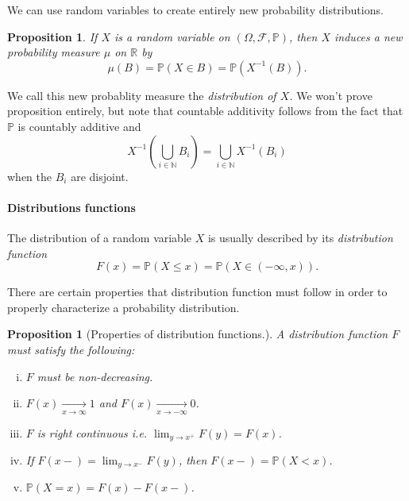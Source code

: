 \documentclass[12pt]{article}
\newcommand{\bbN}{\mathbb{N}}
\newcommand{\bbR}{\mathbb{R}}
\newcommand{\calF}{\mathcal{F}}
\newcommand{\Prob}{\mathbb{P}}
\newtheorem{prop}[thm]{Proposition}
\theoremstyle{definition}
\theoremstyle{remark}
\numberwithin{equation}{section}
\begin{document}
We can use random variables to create entirely new probability distributions. 

\begin{prop}
  If $X$ is a random variable on $(\Omega, \calF, \Prob)$, then $X$ induces a new probability measure $\mu$ on $\bbR$ by
  \begin{equation}
    \mu(B) = \Prob(X \in B) = \Prob( X^{-1}(B) ).
  \end{equation}
\end{prop}
We call this new probablity measure the \emph{distribution of $X$.} We won't prove proposition entirely, but note that countable additivity follows from the fact that $\Prob$ is countably additive and 
\begin{equation}
   X^{-1}\left(\bigcup_{i\in\bbN} B_i\right) = \bigcup_{i\in\bbN} X^{-1}(B_i) 
\end{equation}
when the $B_i$ are disjoint.

\paragraph{Distributions functions}%
\label{par:distributions_functions}

The distribution of a random variable $X$ is usually described by its \emph{distribution function}
\begin{equation}
  F(x) = \Prob(X \leq x) = \Prob( X \in (-\infty, x) ).
\end{equation}

There are certain properties that distribution function must follow in order to properly characterize a probability distribution. 
\begin{prop}[Properties of distribution functions.]
  A distribution function $F$ must satisfy the following:\leavevmode
  \begin{enumerate}[(i)]
    \item $F$ must be non-decreasing.
    \item $F(x) \xrightarrow[x\to\infty]{} 1$ and $F(x) \xrightarrow[x\to-\infty]{} 0$.
    \item $F$ is right continuous i.e. $\lim_{y\to x^+}F(y) = F(x)$.
    \item If $F(x-) = \lim_{y\to x^-}F(y)$, then $F(x-)=\Prob(X<x)$.
    \item $\Prob(X = x) = F(x) - F(x-)$.
  \end{enumerate}
\end{prop}
\end{document}
